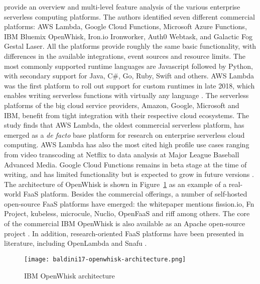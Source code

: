 \textcite{lynn2017preliminary} provide an overview and multi-level feature analysis of the various enterprise serverless computing platforms. The authors identified seven different commercial platforms: AWS Lambda, Google Cloud Functions, Microsoft Azure Functions, IBM Bluemix OpenWhisk, Iron.io Ironworker, Auth0 Webtask, and Galactic Fog Gestal Laser. All the platforms provide roughly the same basic functionality, with differences in the available integrations, event sources and resource limits. The most commonly supported runtime languages are Javascript followed by Python, with secondary support for Java, C\#, Go, Ruby, Swift and others. AWS Lambda was the first platform to roll out support for custom runtimes in late 2018, which enables writing serverless functions with virtually any language \parencite{awslambda0218}. The serverless platforms of the big cloud service providers, Amazon, Google, Microsoft and IBM, benefit from tight integration with their respective cloud ecosystems. The study finds that AWS Lambda, the oldest commercial serverless platform, has emerged as a \textit{de facto} base platform for research on enterprise serverless cloud computing. AWS Lambda has also the most cited high profile use cases ranging from video transcoding at Netflix to data analysis at Major League Baseball Advanced Media. Google Cloud Functions remains in beta stage at the time of writing, and has limited functionality but is expected to grow in future versions \parencite{google18cloudFunctions}. The architecture of OpenWhisk is shown in Figure~\ref{fig:openwhisk} as an example of a real-world FaaS platform. Besides the commercial offerings, a number of self-hosted open-source FaaS platforms have emerged: the \textcite{cncf18serverlessWG} whitepaper mentions fission.io, Fn Project, kubeless, microcule, Nuclio, OpenFaaS and riff among others. The core of the commercial IBM OpenWhisk is also available as an Apache open-source project \parencite{ibm18cloudFunctions}. In addition, research-oriented FaaS platforms have been presented in literature, including OpenLambda \parencite{hendrickson16openlambda} and Snafu \parencite{spillner17snafu}.

\begin{figure}[h]
  \centering
  \texttt{[image: baldini17-openwhisk-architecture.png]}
  \caption{IBM OpenWhisk architecture \parencite{baldini17currentTrends}}
  \label{fig:openwhisk}
\end{figure}

